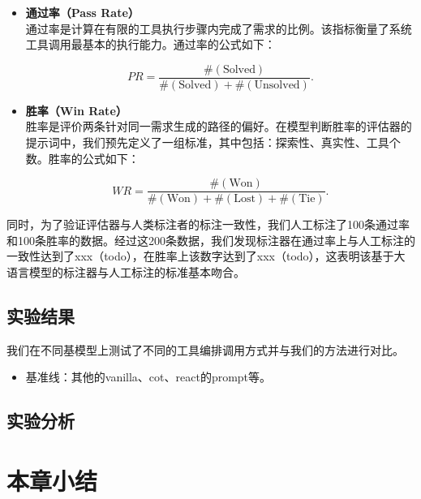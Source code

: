 \begin{itemize}
    \item \textbf{通过率（Pass Rate）} \\
    通过率是计算在有限的工具执行步骤内完成了需求的比例。该指标衡量了系统工具调用最基本的执行能力。通过率的公式如下：

    \begin{equation}
        PR = \frac{ \#(\text{Solved}) }{ \#(\text{Solved}) + \#(\text{Unsolved}) }.
    \end{equation}

    \item \textbf{胜率（Win Rate）} \\
    胜率是评价两条针对同一需求生成的路径的偏好。在模型判断胜率的评估器的提示词中，我们预先定义了一组标准，其中包括：探索性、真实性、工具个数。胜率的公式如下：

    \begin{equation}
        WR = \frac{ \#(\text{Won}) }{ \#(\text{Won}) + \#(\text{Lost}) + \#(\text{Tie}) }.
    \end{equation}

\end{itemize}

同时，为了验证评估器与人类标注者的标注一致性，我们人工标注了100条通过率和100条胜率的数据。经过这200条数据，我们发现标注器在通过率上与人工标注的一致性达到了xxx（todo），在胜率上该数字达到了xxx（todo），这表明该基于大语言模型的标注器与人工标注的标准基本吻合。

\subsection{实验结果}
我们在不同基模型上测试了不同的工具编排调用方式并与我们的方法进行对比。
\begin{itemize}
    \item 基准线：其他的vanilla、cot、react的prompt等。
\end{itemize}

\subsection{实验分析}
\label{subsec:exp_analysis}

\section{本章小结}
\label{sec:summary_chap4}